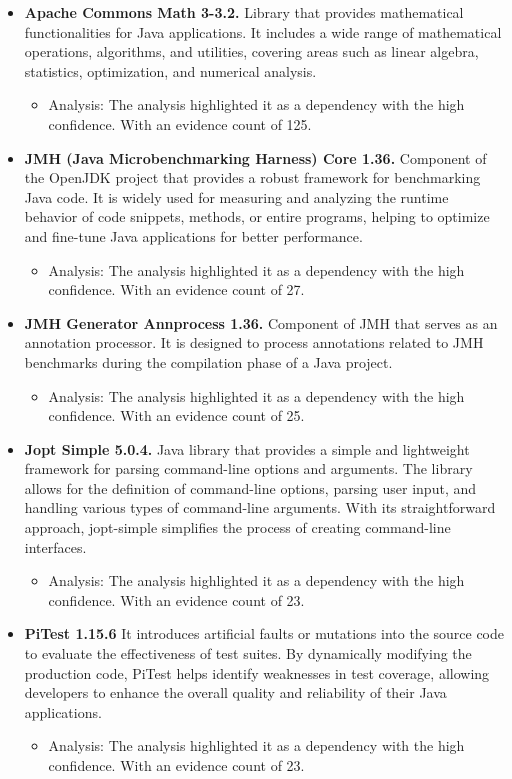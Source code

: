 \documentclass{sigchi}
\begin{document}
\begin{itemize}
    \item \textbf{Apache Commons Math 3-3.2.} Library that provides mathematical functionalities for Java applications. It includes a wide range of mathematical operations, algorithms, and utilities, covering areas such as linear algebra, statistics, optimization, and numerical analysis. 
    \begin{itemize}
        \item Analysis: The analysis highlighted it as a dependency with the high confidence. With an evidence count of 125.
    \end{itemize}
    \item \textbf{JMH (Java Microbenchmarking Harness) Core 1.36.}  Component of the OpenJDK project that provides a robust framework for benchmarking Java code. It is widely used for measuring and analyzing the runtime behavior of code snippets, methods, or entire programs, helping to optimize and fine-tune Java applications for better performance.
    \begin{itemize}
        \item Analysis: The analysis highlighted it as a dependency with the high confidence. With an evidence count of 27.
    \end{itemize}
    \item \textbf{JMH Generator Annprocess 1.36.} Component of JMH that serves as an annotation processor. It is designed to process annotations related to JMH benchmarks during the compilation phase of a Java project.
    \begin{itemize}
        \item Analysis: The analysis highlighted it as a dependency with the high confidence. With an evidence count of 25.
    \end{itemize}
    \item \textbf{Jopt Simple 5.0.4.} Java library that provides a simple and lightweight framework for parsing command-line options and arguments. The library allows for the definition of command-line options, parsing user input, and handling various types of command-line arguments. With its straightforward approach, jopt-simple simplifies the process of creating command-line interfaces.
    \begin{itemize}
        \item Analysis: The analysis highlighted it as a dependency with the high confidence. With an evidence count of 23.
    \end{itemize}
    \item \textbf{PiTest 1.15.6}  It introduces artificial faults or mutations into the source code to evaluate the effectiveness of test suites. By dynamically modifying the production code, PiTest helps identify weaknesses in test coverage, allowing developers to enhance the overall quality and reliability of their Java applications.
    \begin{itemize}
        \item Analysis: The analysis highlighted it as a dependency with the high confidence. With an evidence count of 23.
    \end{itemize}
\end{itemize}
\end{document}
